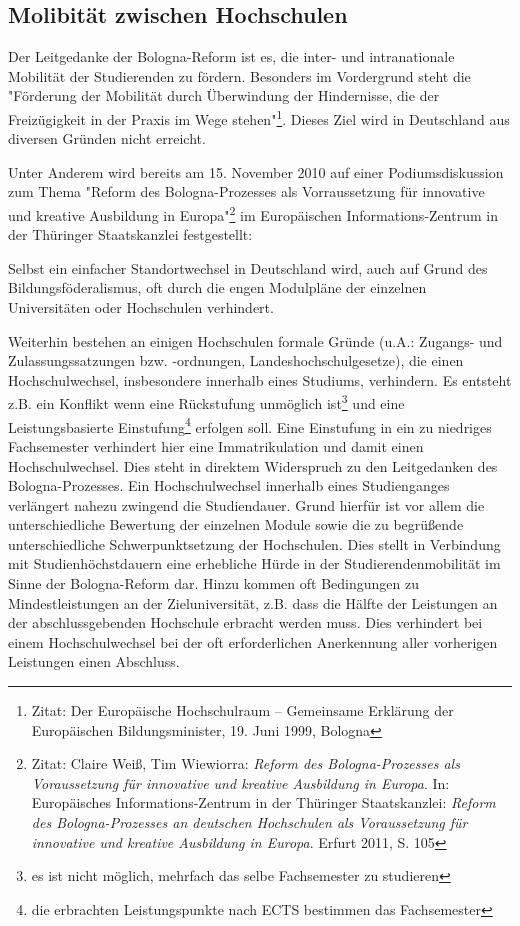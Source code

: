 
\subsection{Molibität zwischen Hochschulen}

Der Leitgedanke der Bologna-Reform ist es, die inter- und intranationale
Mobilität der Studierenden zu fördern. Besonders im Vordergrund steht die
"Förderung der Mobilität durch Überwindung der Hindernisse, die der
Freizügigkeit in der Praxis im Wege stehen"\footnote{Zitat: Der Europäische Hochschulraum – Gemeinsame Erklärung der Europäischen Bildungsminister, 19. Juni 1999, Bologna}.  Dieses Ziel wird in
Deutschland aus diversen Gründen nicht erreicht.

Unter Anderem wird bereits am 15. November 2010 auf einer
Podiumsdiskussion zum Thema "Reform des Bologna-Prozesses als Vorraussetzung
für innovative und kreative Ausbildung in Europa"\footnote{Zitat: Claire Weiß, Tim Wiewiorra: \textit{Reform des Bologna-Prozesses als Voraussetzung
  für innovative und kreative Ausbildung in Europa}. In: Europäisches
  Informations-Zentrum in der Thüringer Staatskanzlei:
  \textit{Reform des Bologna-Prozesses an deutschen Hochschulen als Voraussetzung für
  innovative und kreative Ausbildung in Europa}. Erfurt 2011, S. 105} im Europäischen
Informations-Zentrum in der Thüringer Staatskanzlei festgestellt:
\begin{displayquote}
 Selbst ein einfacher Standortwechsel in Deutschland wird, auch auf Grund des
 Bildungsföderalismus, oft durch die engen Modulpläne der einzelnen
 Universitäten oder Hochschulen verhindert.
\end{displayquote}
Weiterhin bestehen an einigen Hochschulen formale Gründe (u.A.: Zugangs- und
Zulassungssatzungen bzw. -ordnungen, Landeshochschulgesetze), die einen
Hochschulwechsel, insbesondere innerhalb eines Studiums, verhindern. Es entsteht
z.B. ein Konflikt wenn eine Rückstufung unmöglich ist\footnote{es ist nicht
möglich, mehrfach das selbe Fachsemester zu studieren} und eine
Leistungsbasierte Einstufung\footnote{die erbrachten Leistungspunkte nach ECTS
bestimmen das Fachsemester} erfolgen soll. Eine Einstufung in ein zu niedriges
Fachsemester verhindert hier eine Immatrikulation und damit einen
Hochschulwechsel. Dies steht in direktem Widerspruch zu den Leitgedanken des
Bologna-Prozesses.
Ein Hochschulwechsel innerhalb eines Studienganges verlängert nahezu zwingend
die Studiendauer. Grund hierfür ist vor allem die unterschiedliche Bewertung der
einzelnen Module sowie die zu begrüßende unterschiedliche Schwerpunktsetzung der
Hochschulen. Dies stellt in Verbindung mit Studienhöchstdauern eine erhebliche
Hürde in der Studierendenmobilität im Sinne der Bologna-Reform dar.
\newpage
Hinzu kommen oft Bedingungen zu Mindestleistungen an der Zieluniversität, z.B.
dass die Hälfte der Leistungen an der abschlussgebenden Hochschule erbracht
werden muss. Dies verhindert bei einem Hochschulwechsel bei der oft
erforderlichen Anerkennung aller vorherigen Leistungen einen Abschluss.

